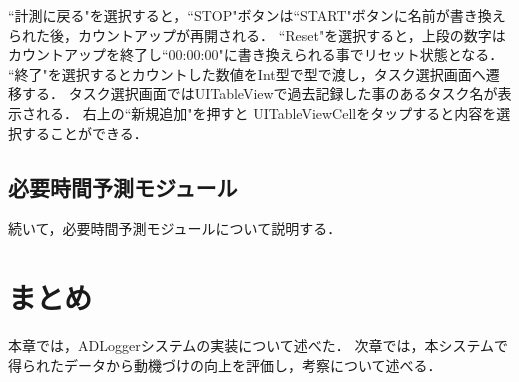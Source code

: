 ``計測に戻る"を選択すると，``STOP"ボタンは``START"ボタンに名前が書き換えられた後，カウントアップが再開される．
``Reset"を選択すると，上段の数字はカウントアップを終了し``00:00:00"に書き換えられる事でリセット状態となる．
``終了"を選択するとカウントした数値をInt型で型で渡し，タスク選択画面へ遷移する．
タスク選択画面ではUITableViewで過去記録した事のあるタスク名が表示される．
右上の``新規追加"を押すと
UITableViewCellをタップすると内容を選択することができる．



\subsection{必要時間予測モジュール}
続いて，必要時間予測モジュールについて説明する．
\section{まとめ}
本章では，ADLoggerシステムの実装について述べた．
次章では，本システムで得られたデータから動機づけの向上を評価し，考察について述べる．
